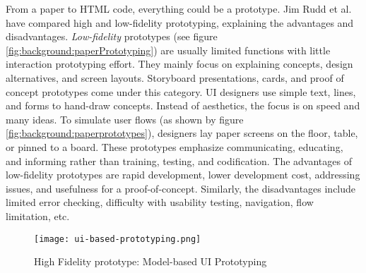 From a paper to HTML code, everything could be a prototype.
Jim Rudd et al. \cite{article:prototyping:highlowfidelity} have compared high and low-fidelity prototyping, explaining the advantages and disadvantages.
\textit{Low-fidelity} prototypes (see figure \ref{fig:background:paperPrototyping}) are usually limited functions with little interaction prototyping effort. They mainly focus on explaining concepts, design alternatives, and screen layouts. 
Storyboard presentations, cards, and proof of concept prototypes come under this category.
UI designers use simple text, lines, and forms to hand-draw concepts. 
Instead of aesthetics, the focus is on speed and many ideas.
To simulate user flows (as shown by figure \ref{fig:background:paperprototypes}), designers lay paper screens on the floor, table, or pinned to a board.
These prototypes emphasize communicating, educating, and informing rather than training, testing, and codification.
The advantages of low-fidelity prototypes are rapid development, lower development cost, addressing issues, and usefulness for a proof-of-concept.
Similarly, the disadvantages include limited error checking, difficulty with usability testing, navigation, flow limitation, etc.
\begin{figure}[htbp!]
  \centering    
  \texttt{[image: ui-based-prototyping.png]}
  \caption[High Fidelity prototyping]{High Fidelity prototype: Model-based UI Prototyping}
  \label{fig:background:uiPrototyping}
\end{figure}

